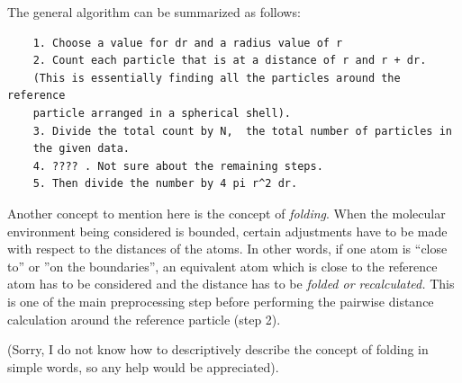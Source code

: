 The general algorithm can be summarized as follows:

\begin{verbatim}
    1. Choose a value for dr and a radius value of r
    2. Count each particle that is at a distance of r and r + dr. 
    (This is essentially finding all the particles around the reference 
    particle arranged in a spherical shell).
    3. Divide the total count by N,  the total number of particles in 
    the given data.
    4. ???? . Not sure about the remaining steps.
    5. Then divide the number by 4 pi r^2 dr.    
\end{verbatim}

Another concept to mention here is the concept of \textit{folding}. When the molecular environment being considered is bounded, certain adjustments have to be made with respect to the distances of the atoms. In other words, if one atom is ``close to'' or ''on the boundaries'', an equivalent atom which is close to the reference atom has to be considered and the distance has to be \textit{folded or recalculated.} This is one of the main preprocessing step before performing the pairwise distance calculation around the reference particle (step 2). 

(Sorry, I do not know how to descriptively describe the concept of folding in simple words, so any help would be appreciated). 
